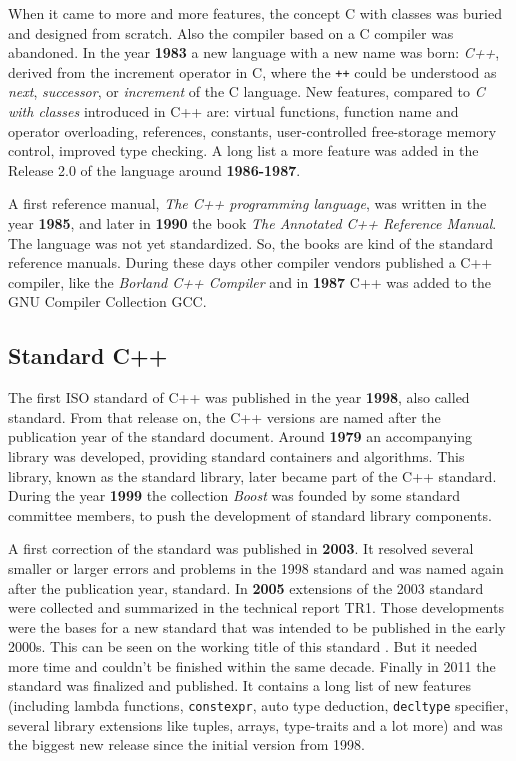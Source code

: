 When it came to more and more features, the concept C with classes was buried and designed from scratch. Also the compiler based on a C compiler
was abandoned. In the year \textbf{1983} a new language with a new name was born: \textit{C++}, derived from the increment operator in C,
where the \texttt{++} could be understood as \emph{next}, \emph{successor}, or \emph{increment} of the C language. New features, compared
to \emph{C with classes} introduced in C++ are: virtual functions, function name and operator overloading, references, constants,
user-controlled free-storage memory control, improved type checking. A long list a more feature was added in the Release 2.0 of the language
around \textbf{1986-1987}.

A first reference manual, \textit{The C++ programming language}, was written in the year \textbf{1985}, and later in \textbf{1990} the book
\textit{The Annotated C++ Reference Manual}. The language was not yet standardized. So, the books are kind of the standard reference manuals.
During these days other compiler vendors published a C++ compiler, like  the \textit{Borland C++ Compiler} and in \textbf{1987} C++ was added
to the GNU Compiler Collection GCC.

\subsection{Standard C++}
The first ISO standard of C++ was published in the year \textbf{1998}, also called  standard. From that release on, the C++ versions are
named after the publication year of the standard document. Around \textbf{1979} an accompanying library was developed, providing standard
containers and algorithms. This library, known as the standard library, later became part of the C++ standard. During the year \textbf{1999}
the collection \emph{Boost} was founded by some standard committee members, to push the development of standard library components.

A first correction of the  standard was published in \textbf{2003}. It resolved several smaller or larger errors and problems in the
1998 standard and was named again after the publication year,  standard. In \textbf{2005} extensions of the 2003 standard were collected
and summarized in the technical report TR1. Those developments were the bases for a new standard that was intended to be published in the
early 2000s. This can be seen on the working title of this standard . But it needed more time and couldn't be finished within the same
decade. Finally in 2011 the standard  was finalized and published. It contains a long list of new features (including lambda functions,
\texttt{constexpr}, auto type deduction, \texttt{decltype} specifier, several library extensions like tuples, arrays, type-traits and a lot more) and was the
biggest new release since the initial version from 1998.

